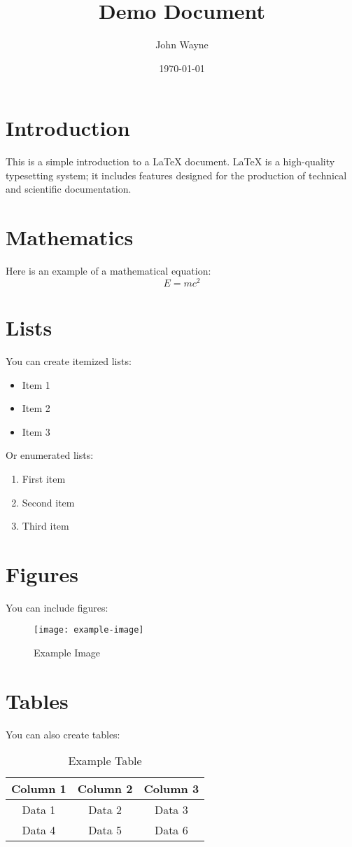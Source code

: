 \documentclass{article}
\title{Demo Document}
\author{John Wayne}
\date{\today}
\begin{document}
\maketitle

\section{Introduction}
This is a simple introduction to a LaTeX document. LaTeX is a high-quality typesetting system; it includes features designed for the production of technical and scientific documentation.

\section{Mathematics}
Here is an example of a mathematical equation:
\[
E = mc^2
\]

\section{Lists}
You can create itemized lists:
\begin{itemize}
    \item Item 1
    \item Item 2
    \item Item 3
\end{itemize}

Or enumerated lists:
\begin{enumerate}
    \item First item
    \item Second item
    \item Third item
\end{enumerate}

\section{Figures}
You can include figures:
\begin{figure}[h]
    \centering
    \texttt{[image: example-image]}
    \caption{Example Image}
    \label{fig:example}
\end{figure}

\section{Tables}
You can also create tables:
\begin{table}[h]
    \centering
    \begin{tabular}{|c|c|c|}
        \hline
        Column 1 & Column 2 & Column 3 \\
        \hline
        Data 1 & Data 2 & Data 3 \\
        Data 4 & Data 5 & Data 6 \\
        \hline
    \end{tabular}
    \caption{Example Table}
    \label{tab:example}
\end{table}
\end{document}
